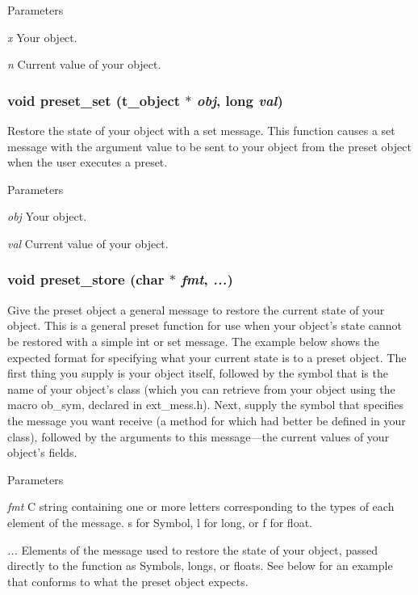 \begin{DoxyParams}{Parameters}
\item[{\em x}]Your object. \item[{\em n}]Current value of your object. \end{DoxyParams}
\hypertarget{group__presets_ga178edd4c9abaecc58ca6379cf2547298}{
\subsubsection[{preset\_\-set}]{\setlength{\rightskip}{0pt plus 5cm}void preset\_\-set ({\bf t\_\-object} $\ast$ {\em obj}, \/  long {\em val})}}
\label{group__presets_ga178edd4c9abaecc58ca6379cf2547298}


Restore the state of your object with a set message. This function causes a set message with the argument value to be sent to your object from the preset object when the user executes a preset.


\begin{DoxyParams}{Parameters}
\item[{\em obj}]Your object. \item[{\em val}]Current value of your object. \end{DoxyParams}
\hypertarget{group__presets_ga5f6d86fdc24e371604b764e7581a4fcb}{
\subsubsection[{preset\_\-store}]{\setlength{\rightskip}{0pt plus 5cm}void preset\_\-store (char $\ast$ {\em fmt}, \/   {\em ...})}}
\label{group__presets_ga5f6d86fdc24e371604b764e7581a4fcb}


Give the preset object a general message to restore the current state of your object. This is a general preset function for use when your object’s state cannot be restored with a simple int or set message. The example below shows the expected format for specifying what your current state is to a preset object. The first thing you supply is your object itself, followed by the symbol that is the name of your object’s class (which you can retrieve from your object using the macro ob\_\-sym, declared in ext\_\-mess.h). Next, supply the symbol that specifies the message you want receive (a method for which had better be defined in your class), followed by the arguments to this message—the current values of your object’s fields.


\begin{DoxyParams}{Parameters}
\item[{\em fmt}]C string containing one or more letters corresponding to the types of each element of the message. s for Symbol, l for long, or f for float. \item[{\em ...}]Elements of the message used to restore the state of your object, passed directly to the function as Symbols, longs, or floats. See below for an example that conforms to what the preset object expects. \end{DoxyParams}
